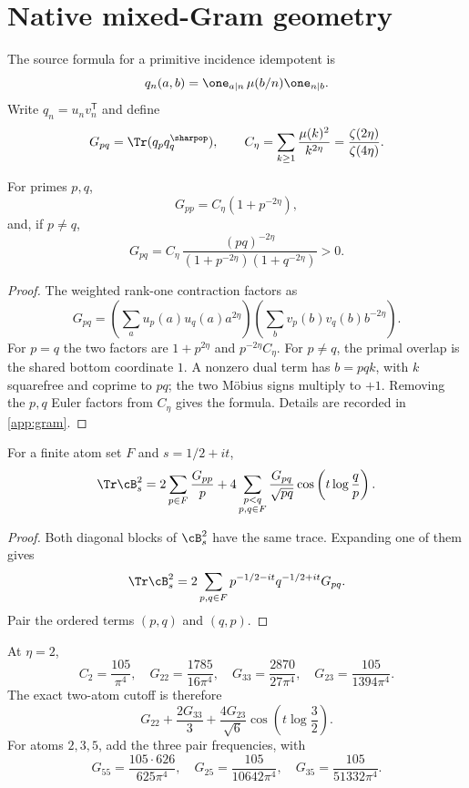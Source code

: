 \section{Native mixed-Gram geometry}
\label{sec:gram}

The source formula for a primitive incidence idempotent is
\[
 q_n(a,b)=\one_{a\mid n}\,
 \mu(b/n)\one_{n\mid b}.
\]
Write $q_n=u_nv_n^{\mathsf T}$ and define
\[
 G_{pq}=\Tr(q_pq_q^{\sharpop}),\qquad
 C_\eta=\sum_{k\ge1}\frac{\mu(k)^2}{k^{2\eta}}
 =\frac{\zeta(2\eta)}{\zeta(4\eta)}.
\]

\begin{theorem}
\label{thm:gram}
For primes $p,q$,
\[
 G_{pp}=C_\eta(1+p^{-2\eta}),
\]
and, if $p\ne q$,
\[
 G_{pq}=
 C_\eta\,
 \frac{(pq)^{-2\eta}}
 {(1+p^{-2\eta})(1+q^{-2\eta})}>0.
\]
\end{theorem}

\begin{proof}
The weighted rank-one contraction factors as
\[
 G_{pq}=
 \left(\sum_a u_p(a)u_q(a)a^{2\eta}\right)
 \left(\sum_b v_p(b)v_q(b)b^{-2\eta}\right).
\]
For $p=q$ the two factors are $1+p^{2\eta}$ and
$p^{-2\eta}C_\eta$.  For $p\ne q$, the primal overlap is the shared
bottom coordinate $1$.  A nonzero dual term has $b=pqk$, with $k$
squarefree and coprime to $pq$; the two M\"obius signs multiply to
$+1$.  Removing the $p,q$ Euler factors from $C_\eta$ gives the
formula.  Details are recorded in \cref{app:gram}.
\end{proof}

\begin{proposition}
\label{prop:b2}
For a finite atom set $F$ and $s=1/2+it$,
\[
 \Tr\cB_s^2
 =2\sum_{p\in F}\frac{G_{pp}}p+
 4\sum_{\substack{p<q\\p,q\in F}}
 \frac{G_{pq}}{\sqrt{pq}}
 \cos\left(t\log\frac qp\right).
\]
\end{proposition}

\begin{proof}
Both diagonal blocks of $\cB_s^2$ have the same trace.  Expanding one
of them gives
\[
 \Tr\cB_s^2
 =2\sum_{p,q\in F}
 p^{-1/2-it}q^{-1/2+it}G_{pq}.
\]
Pair the ordered terms $(p,q)$ and $(q,p)$.
\end{proof}

At $\eta=2$,
\[
 C_2=\frac{105}{\pi^4},\quad
 G_{22}=\frac{1785}{16\pi^4},\quad
 G_{33}=\frac{2870}{27\pi^4},\quad
 G_{23}=\frac{105}{1394\pi^4}.
\]
The exact two-atom cutoff is therefore
\[
 G_{22}+\frac{2G_{33}}3+
 \frac{4G_{23}}{\sqrt6}
 \cos\left(t\log\frac32\right).
\]
For atoms $2,3,5$, add the three pair frequencies, with
\[
 G_{55}=\frac{105\cdot626}{625\pi^4},\quad
 G_{25}=\frac{105}{10642\pi^4},\quad
 G_{35}=\frac{105}{51332\pi^4}.
\]

